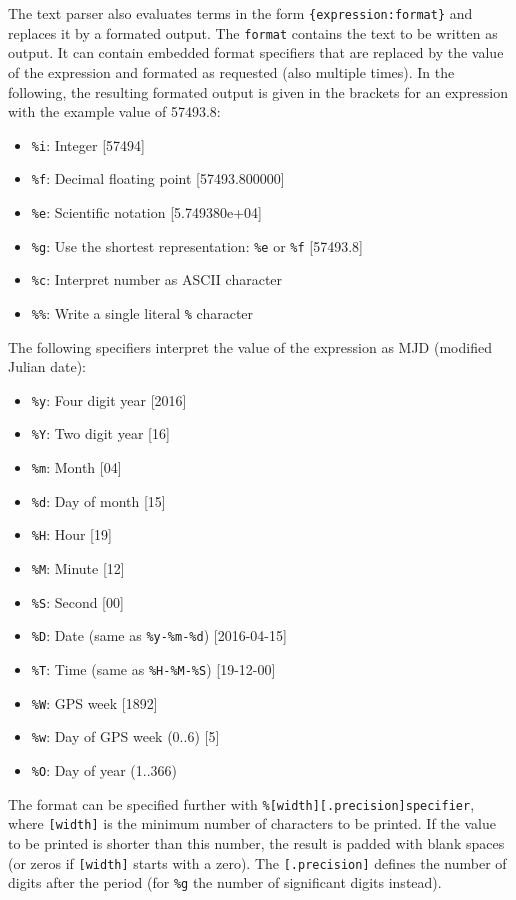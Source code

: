 The text parser also evaluates terms in the form \verb|{expression:format}| and replaces it by a formated
output. The \verb|format| contains the text to be written as output.
It can contain embedded format specifiers that are replaced by the value of the expression
and formated as requested (also multiple times). In the following, the resulting formated output is given in the
brackets for an expression with the example value of 57493.8:
\begin{itemize}
\item \verb|%i|: Integer [57494]
\item \verb|%f|: Decimal floating point [57493.800000]
\item \verb|%e|: Scientific notation [5.749380e+04]
\item \verb|%g|: Use the shortest representation: \verb|%e| or \verb|%f| [57493.8]
\item \verb|%c|: Interpret number as ASCII character
\item \verb|%%|: Write a single literal \verb|%| character
\end{itemize}
The following specifiers interpret the value of the expression as MJD (modified Julian date):
\begin{itemize}
\item \verb|%y|: Four digit year [2016]
\item \verb|%Y|: Two digit year [16]
\item \verb|%m|: Month [04]
\item \verb|%d|: Day of month [15]
\item \verb|%H|: Hour [19]
\item \verb|%M|: Minute [12]
\item \verb|%S|: Second [00]
\item \verb|%D|: Date (same as \verb|%y-%m-%d|) [2016-04-15]
\item \verb|%T|: Time (same as \verb|%H-%M-%S|) [19-12-00]
\item \verb|%W|: GPS week [1892]
\item \verb|%w|: Day of GPS week (0..6) [5]
\item \verb|%O|: Day of year (1..366)
\end{itemize}
The format can be specified further with \verb|%[width][.precision]specifier|,
where \verb|[width]| is the minimum number of characters to be printed.
If the value to be printed is shorter than this number, the result is padded with blank spaces
(or zeros if \verb|[width]| starts with a zero).
The \verb|[.precision]| defines the number of digits after the period (for \verb|%g| the number of
significant digits instead).

